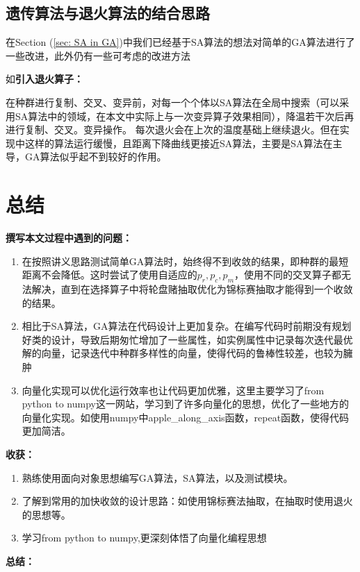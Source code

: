 \documentclass[12pt]{article}
\begin{document}
\subsection{遗传算法与退火算法的结合思路}
在Section (\ref{sec: SA in GA})中我们已经基于SA算法的想法对简单的GA算法进行了一些改进，此外仍有一些可考虑的改进方法\cite{Ref3}

如\textbf{引入退火算子：}

在种群进行复制、交叉、变异前，对每一个个体以SA算法在全局中搜索（可以采用SA算法中的领域，在本文中实际上与一次变异算子效果相同），降温若干次后再进行复制、交叉。变异操作。
每次退火会在上次的温度基础上继续退火。但在实现中这样的算法运行缓慢，且距离下降曲线更接近SA算法，主要是SA算法在主导，GA算法似乎起不到较好的作用。

\section{总结}

\textbf{撰写本文过程中遇到的问题：}
\begin{enumerate}
  \item 在按照讲义思路测试简单GA算法时，始终得不到收敛的结果，即种群的最短距离不会降低。这时尝试了使用自适应的$p_r,p_c,p_m$，使用不同的交叉算子都无法解决，直到在选择算子中将轮盘赌抽取优化为锦标赛抽取才能得到一个收敛的结果。
  \item 相比于SA算法，GA算法在代码设计上更加复杂。在编写代码时前期没有规划好类的设计，导致后期匆忙增加了一些属性，如实例属性中记录每次迭代最优解的向量，记录迭代中种群多样性的向量，使得代码的鲁棒性较差，也较为臃肿
  \item 向量化实现可以优化运行效率也让代码更加优雅，这里主要学习了from python to numpy这一网站，学习到了许多向量化的思想，优化了一些地方的向量化实现。如使用numpy中apple\_along\_axis函数，repeat函数，使得代码更加简洁。
\end{enumerate}

\textbf{收获：}
\begin{enumerate}
  \item 熟练使用面向对象思想编写GA算法，SA算法，以及测试模块。
  \item 了解到常用的加快收敛的设计思路：如使用锦标赛法抽取，在抽取时使用退火的思想等。
  \item 学习from python to numpy,更深刻体悟了向量化编程思想
\end{enumerate}

\textbf{总结：}
\end{document}

